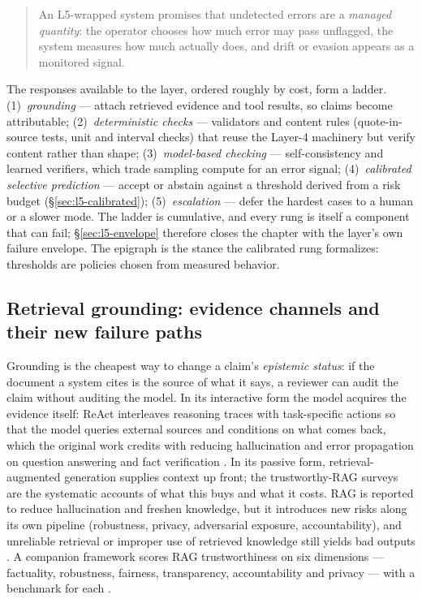 \begin{quote}
An L5-wrapped system promises that undetected errors are a \emph{managed quantity}: the
operator chooses how much error may pass unflagged, the system measures how much actually does,
and drift or evasion appears as a monitored signal.
\end{quote}

The responses available to the layer, ordered roughly by cost, form a ladder.
(1)~\emph{grounding} --- attach retrieved evidence and tool results, so claims become
attributable; (2)~\emph{deterministic checks} --- validators and content rules (quote-in-source
tests, unit and interval checks) that reuse the Layer-4 machinery but verify content rather than
shape; (3)~\emph{model-based checking} --- self-consistency and learned verifiers, which trade
sampling compute for an error signal; (4)~\emph{calibrated selective prediction} --- accept or
abstain against a threshold derived from a risk budget (\S\ref{sec:l5-calibrated});
(5)~\emph{escalation} --- defer the hardest cases to a human or a slower mode. The ladder is
cumulative, and every rung is itself a component that can fail; \S\ref{sec:l5-envelope}
therefore closes the chapter with the layer's own failure envelope. The epigraph is the stance
the calibrated rung formalizes: thresholds are policies chosen from measured behavior.

\subsection{Retrieval grounding: evidence channels and their new failure paths}
\label{sec:l5-grounding}

Grounding is the cheapest way to change a claim's \emph{epistemic status}: if the document a
system cites is the source of what it says, a reviewer can audit the claim without auditing the
model. In its interactive form the model acquires the evidence itself: ReAct interleaves
reasoning traces with task-specific actions so that the model queries external sources and
conditions on what comes back, which the original work credits with reducing hallucination and
error propagation on question answering and fact verification \cite{id221003629}. In its
passive form, retrieval-augmented generation supplies context up front; the trustworthy-RAG
surveys are the systematic accounts of what this buys and what it costs. RAG is reported to
reduce hallucination and freshen knowledge, but it introduces new risks along its own pipeline
(robustness, privacy, adversarial exposure, accountability), and unreliable retrieval or
improper use of retrieved knowledge still yields bad outputs \cite{id250206872}. A companion
framework scores RAG trustworthiness on six dimensions --- factuality, robustness, fairness,
transparency, accountability and privacy --- with a benchmark for each
\cite{id240910102} \evsynth{}.

